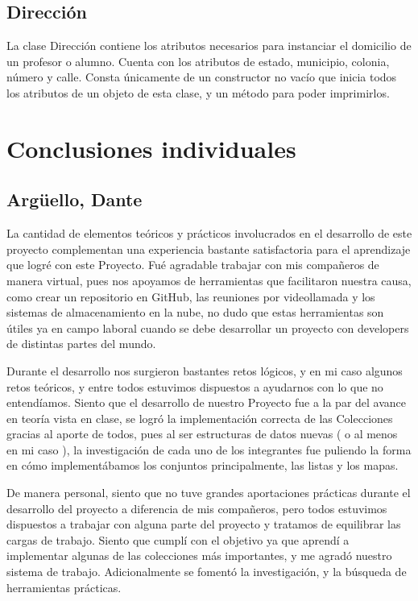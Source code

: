 \documentclass[11pt]{article}
\begin{document}
\subsection{Dirección}
\par

La clase Dirección contiene los atributos necesarios para instanciar el domicilio de un profesor o alumno. Cuenta con los atributos de estado, municipio, colonia, número y calle. Consta únicamente de un constructor no vacío que inicia todos los atributos de un objeto de esta clase, y un método para poder imprimirlos.
\section{Conclusiones individuales}
\subsection{Argüello, Dante}

\par

La cantidad de elementos teóricos y prácticos involucrados
en el desarrollo de este proyecto complementan una experiencia
bastante satisfactoria para el aprendizaje que logré con este
Proyecto. Fué agradable trabajar con mis
compañeros de manera virtual, pues nos apoyamos de herramientas
que facilitaron nuestra causa, como crear un repositorio en 
GitHub, las reuniones por videollamada y los sistemas de almacenamiento
en la nube, no dudo que estas herramientas son útiles ya en campo
laboral cuando se debe desarrollar un proyecto con developers
de distintas partes del mundo. 

\par

Durante el desarrollo nos surgieron bastantes retos lógicos, y en mi caso
algunos retos teóricos, y entre todos estuvimos dispuestos a ayudarnos
con lo que no entendíamos. Siento que el desarrollo de nuestro Proyecto
fue a la par del avance en teoría vista en clase, se logró la implementación
correcta de las Colecciones gracias al aporte de todos, pues al ser
estructuras de datos nuevas ( o al menos en mi caso ), la investigación de 
cada uno de los integrantes fue puliendo la forma en cómo implementábamos
los conjuntos principalmente, las listas y los mapas.

\par

De manera personal, siento que no tuve grandes aportaciones prácticas
durante el desarrollo del proyecto a diferencia de mis compañeros, pero todos
estuvimos dispuestos a trabajar con alguna parte del proyecto y tratamos 
de equilibrar las cargas de trabajo. Siento que cumplí con el objetivo ya que aprendí 
a implementar algunas de las colecciones más importantes, y me agradó nuestro
sistema de trabajo. Adicionalmente se fomentó la investigación, y la búsqueda
de herramientas prácticas.
\end{document}
